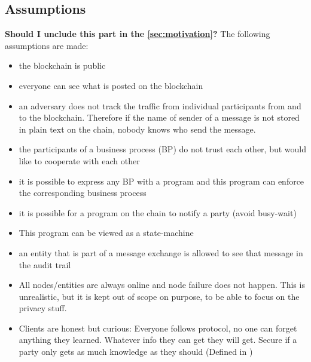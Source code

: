 \documentclass[runningheads]{llncs}
\begin{document}
\subsection{Assumptions}
\textbf{Should I unclude this part in the \ref{sec:motivation}?}
The following assumptions are made: 
\begin{itemize}
    \item the blockchain is public
    \item everyone can see what is posted on the blockchain
    \item an adversary does not track the traffic from individual participants from and to the blockchain. Therefore if the name of sender of a message is not stored in plain text on the chain, nobody knows who send the message.
    \item the participants of a business process (BP) do not trust each other, but would like to cooperate with each other
    \item it is possible to express any BP with a program and this program can enforce the corresponding business process
    \item it is possible for a program on the chain to notify a party (avoid busy-wait) 
    \item This program can be viewed as a state-machine
     \item an entity that is part of a message exchange is allowed to see that message in the audit trail
     \item All nodes/entities are always online and node failure does not happen. This is unrealistic, but it is kept out of scope on purpose, to be able to focus on the privacy stuff.
     \item Clients are honest but curious: Everyone follows protocol, no one can forget anything they learned. Whatever info they can get they will get. Secure if a party only gets as much knowledge as they should (Defined in \cite{xiong2011cloudseal} \cite{paverd2014modelling})
\end{itemize}
\end{document}
